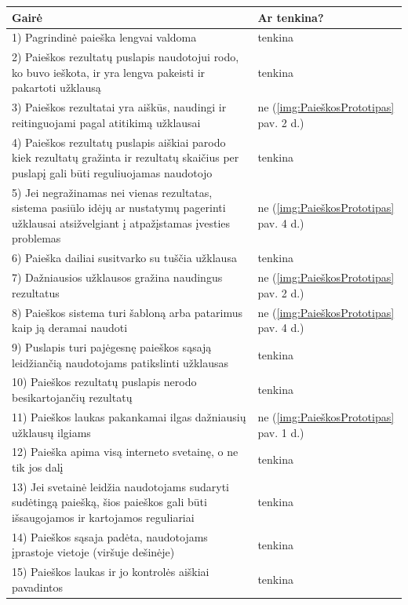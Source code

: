\documentclass{VUMIFPSkursinis}
\begin{document}
\begin{center}
\begin{tabular}{ |p{13cm}|p{}| } 
 \hline
	Gairė & Ar tenkina? \\ \hline
	1) Pagrindinė paieška lengvai valdoma & tenkina \\ \hline
	2) Paieškos rezultatų puslapis naudotojui rodo, ko buvo ieškota, ir yra lengva pakeisti ir pakartoti užklausą & tenkina \\ \hline
	3) Paieškos rezultatai yra aiškūs, naudingi ir reitinguojami pagal atitikimą užklausai & ne (\ref{img:PaieškosPrototipas} pav. 2 d.) \\ \hline
	4) Paieškos rezultatų puslapis aiškiai parodo kiek rezultatų gražinta ir rezultatų skaičius per puslapį gali būti reguliuojamas naudotojo & tenkina \\ \hline
	5) Jei negražinamas nei vienas rezultatas, sistema pasiūlo idėjų ar nustatymų pagerinti užklausai atsižvelgiant į atpažįstamas įvesties problemas & ne (\ref{img:PaieškosPrototipas} pav. 4 d.) \\ \hline
	6) Paieška dailiai susitvarko su tuščia užklausa & tenkina \\ \hline
	7) Dažniausios užklausos gražina naudingus rezultatus & ne (\ref{img:PaieškosPrototipas} pav. 2 d.) \\ \hline
	8) Paieškos sistema turi šabloną arba patarimus kaip ją deramai naudoti & ne (\ref{img:PaieškosPrototipas} pav. 4 d.) \\ \hline
	9) Puslapis turi pajėgesnę paieškos sąsają leidžiančią naudotojams patikslinti užklausas & tenkina \\ \hline
	10) Paieškos rezultatų puslapis nerodo besikartojančių rezultatų & tenkina \\ \hline
	11) Paieškos laukas pakankamai ilgas dažniausių užklausų ilgiams & ne (\ref{img:PaieškosPrototipas} pav. 1 d.) \\ \hline
	12) Paieška apima visą interneto svetainę, o ne tik jos dalį & tenkina \\ \hline
	13) Jei svetainė leidžia naudotojams sudaryti sudėtingą paiešką, šios paieškos gali būti išsaugojamos ir kartojamos reguliariai & tenkina \\ \hline
	14) Paieškos sąsaja padėta, naudotojams įprastoje vietoje (viršuje dešinėje) & tenkina \\ \hline
	15) Paieškos laukas ir jo kontrolės aiškiai pavadintos & tenkina \\ \hline

\end{tabular}
\end{center}
\end{document}
